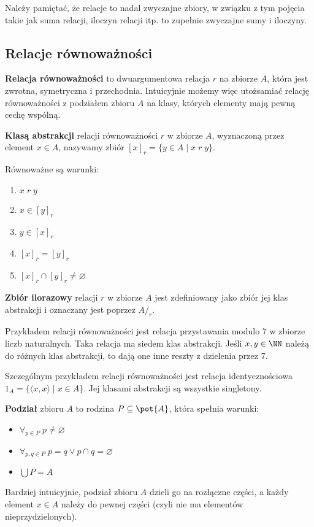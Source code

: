 Należy pamiętać, że relacje to nadal zwyczajne zbiory, w związku z tym pojęcia takie jak suma relacji, iloczyn relacji itp. to zupełnie zwyczajne sumy i iloczyny.

\subsection{Relacje równoważności}
\textbf{Relacja równoważności} to dwuargumentowa relacja $r$ na zbiorze $A$, która jest zwrotna, symetryczna i przechodnia. Intuicyjnie możemy więc utożsamiać relację równoważności z podziałem zbioru $A$ na klasy, których elementy mają pewną cechę wspólną.

\textbf{Klasą abstrakcji} relacji równoważności $r$ w zbiorze $A$, wyznaczoną przez element $x \in A$, nazywamy zbiór $[x]_r = \{y \in A \; | \; x \; r \; y\}$.

Równoważne są warunki:
\begin{enumerate}
    \item $x \; r \; y$
    \item $x \in [y]_r$
    \item $y \in [x]_r$
    \item $[x]_r = [y]_r$
    \item $[x]_r \cap [y]_r \neq \varnothing$
\end{enumerate}

\textbf{Zbiór ilorazowy} relacji $r$ w zbiorze $A$ jest zdefiniowany jako zbiór jej klas abstrakcji i oznaczany jest poprzez $A/_r$.

\begin{example}
    Przykładem relacji równoważności jest relacja przystawania modulo 7 w zbiorze liczb naturalnych. Taka relacja ma siedem klas abstrakcji. Jeśli $x, y \in \NN$ należą do różnych klas abstrakcji, to dają one inne reszty z dzielenia przez 7.
\end{example}

\begin{example}
    Szczególnym przykładem relacji równoważności jest relacja identycznościowa $1_A = \{ \langle x, x \rangle \; | \; x \in A\}$. Jej klasami abstrakcji są wszystkie singletony.
\end{example}

\textbf{Podział} zbioru $A$ to rodzina $P \subseteq \pot{A}$, która spełnia warunki:
\begin{itemize}
    \item $\forall_{p \in P} \; p \neq \varnothing$
    \item $\forall_{p, q \in P} \; p = q \lor p \cap q = \varnothing$
    \item $\bigcup P = A$
\end{itemize}
Bardziej intuicyjnie, podział zbioru $A$ dzieli go na rozłączne części, a każdy element $x \in A$ należy do pewnej części (czyli nie ma elementów nieprzydzielonych).

